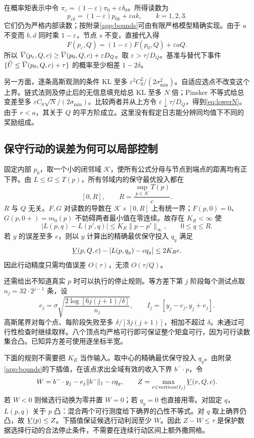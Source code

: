 在概率矩表示中令 $\pi_\varepsilon=(1-\varepsilon)\pi_0+\varepsilon\delta_0$。所得读数为
\begin{equation}
 p_{\varepsilon k}=(1-\varepsilon)p_{0k}+\varepsilon ak,
 \qquad k=1,2,3.
\end{equation}
它们仍为严格内部读数；按附录\ref{app:bounds}可由有限严格模型精确实现。由于 $a$ 不变而 $b,d$ 同时乘 $1-\varepsilon$，节点 $s$ 不变，直接代入得
\[
 F(p_\varepsilon,Q)=(1-\varepsilon)F(p_0,Q)+\varepsilon aQ.
\]
所以 $\overline V(p_\varepsilon,Q,c)\geq\overline V(p_0,Q,c)+\varepsilon D_Q$。取 $\varepsilon>\tau/D_Q$。基准与替代下事件 $\{\widehat U\leq\overline V(p_0,Q,c)+\tau\}$ 的概率至少相差 $1-2\delta$。

另一方面，逐条高斯观测的条件 KL 至多 $\varepsilon^2 C_0^2/(2\sigma_{\min}^2)$。自适应选点不改变这个上界。链式法则及停止后的无信息填充给总 KL 至多 $N$ 倍；Pinsker 不等式给总变差至多 $\varepsilon C_0\sqrt N/(2\sigma_{\min})$。比较两者并从上方令 $\varepsilon\downarrow\tau/D_Q$，得到\eqref{eq:lowerN}。由于 $r<a$，其关于 $Q$ 的平方阶成立。这里没有假定日志能分辨同均值下不同的奖励组成。

\subsection{保守行动的误差为何可以局部控制}
固定内部 $p_0$，取一个小的闭邻域 $\mathcal K$，使所有公式分母与节点到端点的距离均有正下界。由 $L\leq G\leq T(p)$，所有邻域内的保守最优投入都在
\[
 [0,R],\qquad R=\frac{\sup_{p\in\mathcal K}T(p)}c.
\]
$R$ 与 $Q$ 无关。$F,G$ 对读数的导数在 $\mathcal K\times[0,R]$ 上有统一界；$F(p,0)=0$、$G(p,0+)=m_0(p)$ 不妨碍两者最小值在零连续。故存在 $K_R<\infty$ 使
\[
 |L(p,q)-L(p',q)|\leq K_R\|p-p'\|_\infty,
 \qquad 0\leq q\leq R.
\]
若 $y$ 的误差至多 $e$，则以 $y$ 计算出的精确最优保守投入 $q_y$ 满足
\[
 \underline V(p,Q,c)-[L(p,q_y)-cq_y]\leq2K_Re.
\]
因此行动精度只需均值误差 $O(\tau)$，无须 $O(\tau/Q)$。

还需给出不知道真实 $p$ 时可以执行的停止规则。等方差下第 $j$ 阶段每个测试点取 $n_j=32\cdot2^{j-1}$ 条，设
\begin{equation}\label{eq:conf}
 e_j=\sigma\sqrt{\frac{2\log[6j(j+1)/\delta]}{n_j}},
 \qquad I_j=[y_j-e_j,y_j+e_j].
\end{equation}
高斯尾界对每个点、每阶段失败至多 $\delta/[3j(j+1)]$，相加不超过 $\delta$。未通过可行性检查时继续取样。八个顶点均严格可行即可保证整个矩盒可行，因为可行读数集合凸。已知异方差可使用逐坐标半宽。

下面的规则不需要把 $K_R$ 当作输入。取中心的精确最优保守投入 $q_y$。由附录\ref{app:bounds}的下插值，在该点求出全域有效的收入下界 $b^-\cdot p$，令
\begin{equation}\label{eq:stopW}
 W=b^-\cdot y_j-e_j\|b^-\|_1-cq_y,
 \qquad Z=\max_{v\in\operatorname{vertices}(I_j)}\underline V(v,Q,c).
\end{equation}
若 $W<0$ 则候选行动换为零并置 $W=0$；若 $q_y=0$ 也直接用零。对固定 $q$，$L(p,q)$ 关于 $p$ 凸：混合两个可行测度给下确界的凸性不等式。对 $q$ 取上确界仍凸，故 $\underline V(p)\leq Z$。下插值保证候选行动利润至少 $W$。因此 $Z-W\leq\tau$ 是保护数据选择行动的合法停止条件，不需要在连续行动区间上额外撒网格。

